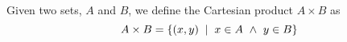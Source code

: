 \begin{definition}
\label{def:cartesianproduct}
	Given two sets, $A$ and $B$, we define the Cartesian product $A \times B$ as
	\begin{equation*}
		A \times B = \{(x,y)\; \mid \; x \in A \;\mathrel{\wedge}\; y \in B\}
	\end{equation*}
\end{definition}